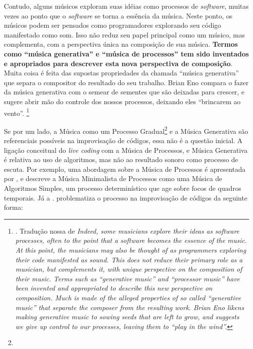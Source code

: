 \begin{citacao}
Contudo, alguns músicos exploram suas idéias como processos de \emph{software}, muitas vezes ao ponto que o \emph{software} se torna a essência da música. Neste ponto, os músicos podem ser pensados como programadores explorando seu código manifestado como som. Isso não reduz seu papel principal como um músico, mas complementa, com a perspectiva única na composição de sua música. \textbf{Termos como ``música generativa'' e ``música de processos'' tem sido inventados e apropriados para descrever esta nova perspectiva de composição}. Muita coisa é feita das supostas propriedades da chamada ``música generativa'' que separa o compositor do resultado do seu trabalho. Brian Eno compara o fazer da música generativa com o semear de sementes que são deixadas para crescer, e sugere abrir mão do controle dos nossos processos, deixando eles ``brincarem ao vento''. \footnote{. Tradução nossa de \emph{Indeed, some musicians explore their ideas as software processes, often to the point that a software becomes the essence of the music. At this point, the musicians may also be thought of as programmers exploring their code manifested as sound. This does not reduce their primary role as a musician, but complements it, with unique perspective on the composition of their music. Terms such as “generative music” and “processor music” have been invented and appropriated to describe this new perspective on composition. Much is made of the alleged properties of so called “generative music” that separate the composer from the resulting work. Brian Eno likens making generative music to sowing seeds that are left to grow, and suggests we give up control to our processes, leaving them to “play in the wind”.}}
\end{citacao}

Se por um lado, a Música como um Processo Gradual\footnote{} e a Música Generativa são referenciais possíveis na improvisação de códigos, essa não é a questão inicial. A ligação conceitual do \emph{live coding} com a Música de Processos, e Música Generativa é relativa ao uso de algoritmos, mas não ao resultado sonoro como processo de escuta. Por exemplo, uma abordagem sobre a Música de Processos é apresentada por , e descreve a Música Minimalista de Processos como uma Música de Algoritmos Simples,  um processo determinístico que age sobre focos de quadros temporais. Já a \cite{eno_generative_1996}.  problematiza o processo na improvisação de códigos da seguinte forma:

